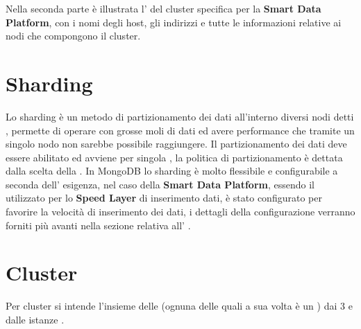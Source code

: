\documentclass[a4paper,10pt,english]{sphinxmanual}
\begin{document}
Nella seconda parte è illustrata l'{\hyperref[cluster_architecture/architecture:deploy-architecture]{\emph{}}} del cluster specifica per la \textbf{Smart
Data Platform}, con i nomi degli host, gli indirizzi e tutte le informazioni relative ai nodi
che compongono il cluster.


\section{Sharding}
\label{cluster_architecture/architecture:sharding}\label{cluster_architecture/architecture:id1}
Lo sharding è un metodo di partizionamento dei dati all'interno diversi nodi detti {\hyperref[cluster_architecture/architecture:shard]{\emph{}}},
permette di operare con grosse moli di dati ed avere performance che tramite un singolo nodo
non sarebbe possibile raggiungere.
Il partizionamento dei dati deve essere abilitato ed avviene per singola , la
politica di partizionamento è dettata dalla scelta della .
In MongoDB lo sharding è molto flessibile e configurabile a seconda dell' esigenza, nel caso della
\textbf{Smart Data Platform}, essendo il {\hyperref[cluster_architecture/architecture:cluster]{\emph{}}} utilizzato per lo \textbf{Speed Layer} di inserimento
dati, è stato configurato per favorire la velocità di inserimento dei dati, i dettagli della
configurazione verranno forniti più avanti nella sezione relativa all' {\hyperref[cluster_architecture/architecture:deploy-architecture]{\emph{}}}.


\section{Cluster}
\label{cluster_architecture/architecture:cluster}\label{cluster_architecture/architecture:id2}
Per cluster si intende l'insieme delle {\hyperref[cluster_architecture/architecture:shard]{\emph{}}} (ognuna delle quali a sua volta è un
{\hyperref[cluster_architecture/architecture:replica-set]{\emph{}}}) dai 3 {\hyperref[cluster_architecture/architecture:config-server]{\emph{}}} e dalle istanze {\hyperref[cluster_architecture/architecture:mongos]{\emph{}}}.
\end{document}

